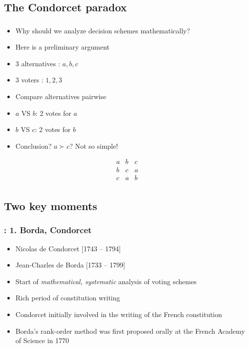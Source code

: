 \documentclass[french,english]{beamer}
\begin{document}
\subsection{The Condorcet paradox}
\begin{frame}
	\frametitle{\subsecname}
	\begin{itemize}
		\item Why should we analyze decision schemes mathematically?
		\item Here is a preliminary argument
		\item 3 alternatives : $a, b, c$
		\item 3 voters : $1, 2, 3$
		\item Compare alternatives pairwise
		\item $a$ VS $b$: 2 votes for $a$
		\item $b$ VS $c$: 2 votes for $b$
		\item Conclusion? \pause $a \succ c$? Not so simple!
	\end{itemize}
	\begin{equation}
		\begin{array}{rrr}
			a	&b	&c\\
			b	&c	&a\\
			c	&a	&b\\
		\end{array}
	\end{equation}
\end{frame}

\subsection{Two key moments}
\begin{frame}
	\frametitle{\subsecname: 1. Borda, Condorcet}
	\begin{itemize}
		\item Nicolas de Condorcet [1743 – 1794]
		\item Jean-Charles de Borda [1733 – 1799]
		\item Start of \emph{mathematical, systematic} analysis of voting schemes
		\item Rich period of constitution writing
		\item Condorcet initially involved in the writing of the French constitution
		\item Borda’s rank-order method was first proposed orally at the French Academy of Science in 1770 \citep{suzumura_introduction_2002}
	\end{itemize}
\end{frame}
\end{document}
